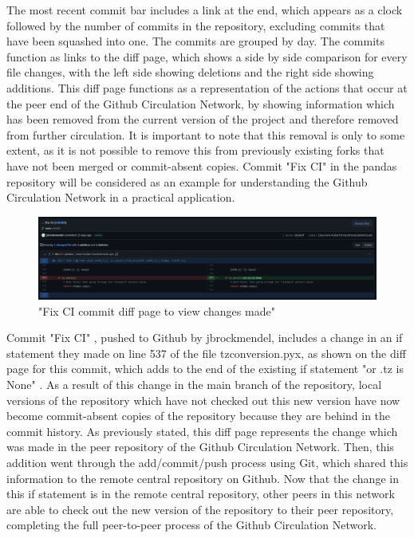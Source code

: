 The most recent commit bar includes a link at the end, which appears as a clock followed by the number of commits in the repository, excluding commits that have been squashed into one. The commits are grouped by day. The commits function as links to the diff page, which shows a side by side comparison for every file changes, with the left side showing deletions and the right side showing additions. This diff page functions as a representation of the actions that occur at the peer end of the Github Circulation Network, by showing information which has been removed from the current version of the project and therefore removed from further circulation. It is important to note that this removal is only to some extent, as it is not possible to remove this from previously existing forks that have not been merged or commit-absent copies. Commit "Fix CI" in the pandas repository will be considered as an example for understanding the Github Circulation Network in a practical application. 

\begin{figure}[hbt!]
\begin{center}
\includegraphics[width=.8\textwidth]{./images/fix_CI_diff.png}
\caption{"Fix CI commit diff page to view changes made"}
\vspace{0in}
\end{center}
\end{figure}

Commit "Fix CI" , pushed to Github by jbrockmendel, includes a change in an if statement they made on line 537 of the file tzconversion.pyx, as shown on the diff page for this commit, which adds to the end of the existing if statement "or .tz is None" \cite{pandasrepo}. As a result of this change in the main branch of the repository, local versions of the repository which have not checked out this new version have now become commit-absent copies of the repository because they are behind in the commit history. As previously stated, this diff page represents the change which was made in the peer repository of the Github Circulation Network. Then, this addition went through the add/commit/push process using Git, which shared this information to the remote central repository on Github. Now that the change in this if statement is in the remote central repository, other peers in this network are able to check out the new version of the repository to their peer repository, completing the full peer-to-peer process of the Github Circulation Network. 

